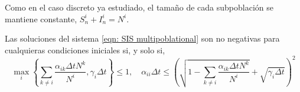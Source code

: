Como en el caso discreto ya estudiado, el tamaño de cada subpoblación se mantiene constante, $S_n^i+I_n^i=N^i$.

\begin{proposition}
Las soluciones del sistema \eqref{eqn: SIS multipoblational} son no negativas para cualquieras condiciones iniciales si, y solo si,
$$\max_i \left\{ \sum_{k\neq i}\frac{\alpha_{ik}\Delta tN^k}{N^i}, \gamma_i\Delta t \right\} \leq 1, \quad  \alpha_{ii}\Delta t\leq \left( \sqrt{1-\sum_{k\neq i}\frac{\alpha_{ik}\Delta tN^k}{N^i}} + \sqrt{\gamma_i\Delta t} \right)^2$$
\end{proposition}





